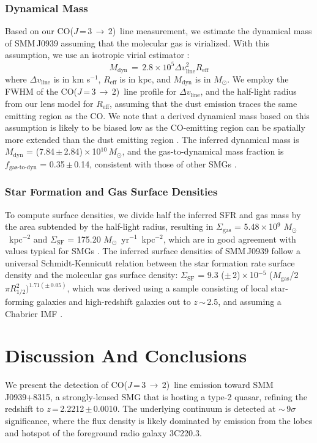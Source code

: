 \documentclass[iop]{emulateapj}
\newcommand{\Msun}{\mbox{$M_{\odot}$}}
\newcommand{\CO}{\mbox{CO($J$\,=\,3\,$\rightarrow$\,2) }}
\newcommand{\eg}{{\sl e.g.,~}}
\newcommand{\pmOne}{\mbox{$^{-1}$}}
\begin{document}
\subsubsection{Dynamical Mass}
Based on our \CO line measurement, we estimate the dynamical mass of SMM\,J0939 assuming that the molecular gas is virialized. With this assumption, we use an isotropic virial estimator \citep[\eg][]{Engel10a}:
\begin{equation}
M_\textrm{dyn}\,=\,2.8\times 10^5\Delta v_\textrm{line}^ 2 R_\textrm{eff}
\end{equation}
where $\Delta v_\textrm{line}$ is in km\,\,s\pmOne, $R_\textrm{eff}$ is in kpc, and $M_\textrm{dyn}$ is in \Msun.
We employ the FWHM of the \CO line profile for $\Delta v_\textrm{line}$,
and the half-light radius from our lens model for $R_\textrm{eff}$, assuming that the dust emission traces the same emitting region as the CO. We note that a derived dynamical mass based on this assumption is likely to be biased low as the CO-emitting region can be spatially more extended than the dust emitting region \citep[\eg][]{Tacconi06a, Riechers11c,Riechers11d,Ivison11a}.
% 
The inferred dynamical mass is $M_\textrm{dyn}$ = (7.84\,$\pm$\,2.84)\,$\times$\,10$^{10}$\,\Msun, and the gas-to-dynamical mass fraction is $f_\textrm{gas-to-dyn}$ = 0.35\,$\pm$\,0.14, consistent with those of other SMGs \citep{Tacconi06a}.

\subsubsection{Star Formation and Gas Surface Densities}
To compute surface densities, we divide half the inferred SFR and gas mass by the area subtended by the half-light
radius, resulting in $\Sigma_\textrm{gas}$ = 5.48\,$\times$\,10$^9$ \Msun~kpc$^{-2}$ and $\Sigma_\textrm{SF}$ = 175.20 \Msun~yr\pmOne~kpc$^{-2}$, which are in good agreement with values typical for SMGs \citep{Tacconi08a}. 
The inferred surface densities of SMM\,J0939 follow a universal Schmidt-Kennicutt relation between the star formation rate
surface density and the molecular gas surface density: $\Sigma_\textrm{SF}$ = 9.3 ($\pm$\,2)\,$\times$\,10$^{-5}$ ($M_\textrm{gas}$/2$\pi R_\textrm{1/2}^2)^{1.71(\pm\,0.05)}$, which was derived using a sample consisting of local star-forming galaxies and high-redshift
galaxies
out to $z$\,$\sim$\,2.5, and assuming a Chabrier IMF \citep{B07a}.

\section{Discussion And Conclusions}

We present the detection of \CO line emission toward SMM\,J0939+8315, a strongly-lensed SMG that is hosting a type-2 quasar, refining the redshift
to $z$\,=\,2.2212\,$\pm$\,0.0010. The underlying continuum is detected at $\sim$\,9$\sigma$ significance, where the flux density is likely dominated by emission from the lobes and hotspot of the foreground radio galaxy 3C220.3.
\end{document}

